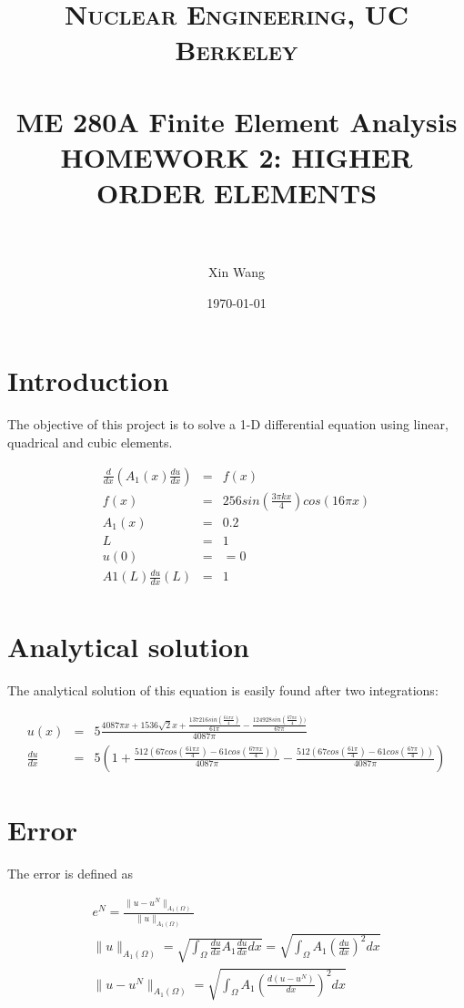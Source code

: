 \documentclass[paper=a4, fontsize=11pt]{article} %
\title{	
\normalfont \normalsize 
\textsc{Nuclear Engineering, UC Berkeley} \\ [25pt] %
\horrule{0.5pt} \\[0.4cm] %
\huge ME 280A Finite Element Analysis \\HOMEWORK 2: HIGHER ORDER ELEMENTS  \\  %
\horrule{2pt} \\[0.5cm] %
}
\author{Xin Wang} %
\date{\normalsize\today} %
\begin{document}
\maketitle %

\newpage
\section{Introduction}
The objective of this project is to solve a 1-D differential equation using linear, quadrical and cubic elements. 

\begin{eqnarray}
\frac{d}{dx}(A_1(x) \frac{du}{dx}) &=& f(x)\nonumber\\
f(x)&=&256sin(\frac{3\pi kx}{4})cos(16 \pi x) \nonumber\\
A_1(x)& = &0.2 \nonumber\\
L&=&1 \nonumber\\
u(0)& =& =0 \nonumber\\
A1(L)\frac{du}{dx}(L) &=& 1 \nonumber\\
\end{eqnarray}

\section{Analytical solution}
The analytical solution of this equation is easily found after two integrations:

\begin{eqnarray}
u(x)&=& 5\frac{4087\pi x + 1536\sqrt{2}x + \frac{137216sin(\frac{61\pi x}{4})}{61\pi}- \frac{124928sin(\frac{67\pi x}{4}))}{67\pi}}{4087\pi}\nonumber\\
\frac{du}{dx}&=& 5(1+ \frac{512(67cos(\frac{61\pi x}{4})- 61cos(\frac{67\pi x}{4}))}{4087\pi} - \frac{512(67cos(\frac{61\pi }{4})- 61cos(\frac{67\pi}{4}))}{4087\pi})
\end{eqnarray}

\section{Error}
The error is defined as 

\begin{eqnarray}
e^N = \frac{\| u -u^N \| _{A_1(\Omega)}} {\| u \| _{A_1 (\Omega)}} \nonumber\\
\| u \| _{A_1 (\Omega)} = \sqrt{\int_{\Omega} \frac{du}{dx} A_1 \frac{du}{dx} dx} = \sqrt{\int_{\Omega} A_1(\frac{du}{dx})^2 dx}\nonumber\\
\| u -u^N \| _{A_1(\Omega)} = \sqrt{\int_{\Omega} A_1 (\frac{d(u-u^N)}{dx})^2 dx}
\end{eqnarray}
\end{document}
